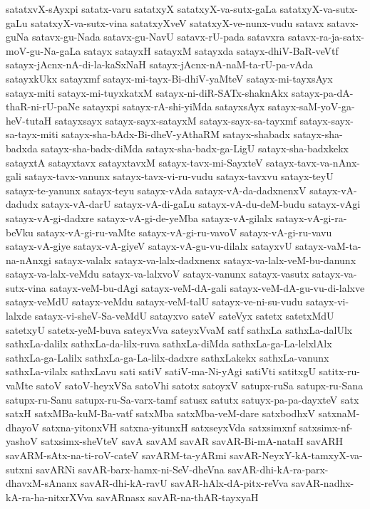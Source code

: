{satatxvX-sAyxpi
satatx-varu
satatxyX
satatxyX-va-sutx-gaLa
satatxyX-va-sutx-gaLu
satatxyX-va-sutx-vina
satatxyXveV
satatxyX-ve-nunx-vudu
satavx
satavx-guNa
satavx-gu-Nada
satavx-gu-NavU
satavx-rU-pada
satavxra
satavx-ra-ja-satx-moV-gu-Na-gaLa
satayx
satayxH
satayxM
satayxda
satayx-dhiV-BaR-veVtf
satayx-jAcnx-nA-di-la-kaSxNaH
satayx-jAcnx-nA-naM-ta-rU-pa-vAda
satayxkUkx
satayxmf
satayx-mi-tayx-Bi-dhiV-yaMteV
satayx-mi-tayxsAyx
satayx-miti
satayx-mi-tuyxkatxM
satayx-ni-diR-SATx-shaknAkx
satayx-pa-dA-thaR-ni-rU-paNe
satayxpi
satayx-rA-shi-yiMda
satayxsAyx
satayx-saM-yoV-ga-heV-tutaH
satayxsayx
satayx-sayx-satayxM
satayx-sayx-sa-tayxmf
satayx-sayx-sa-tayx-miti
satayx-sha-bAdx-Bi-dheV-yAthaRM
satayx-shabadx
satayx-sha-badxda
satayx-sha-badx-diMda
satayx-sha-badx-ga-LigU
satayx-sha-badxkekx
satayxtA
satayxtavx
satayxtavxM
satayx-tavx-mi-SayxteV
satayx-tavx-va-nAnx-gali
satayx-tavx-vanunx
satayx-tavx-vi-ru-vudu
satayx-tavxvu
satayx-teyU
satayx-te-yanunx
satayx-teyu
satayx-vAda
satayx-vA-da-dadxnenxV
satayx-vA-dadudx
satayx-vA-darU
satayx-vA-di-gaLu
satayx-vA-du-deM-budu
satayx-vAgi
satayx-vA-gi-dadxre
satayx-vA-gi-de-yeMba
satayx-vA-gilalx
satayx-vA-gi-ra-beVku
satayx-vA-gi-ru-vaMte
satayx-vA-gi-ru-vavoV
satayx-vA-gi-ru-vavu
satayx-vA-giye
satayx-vA-giyeV
satayx-vA-gu-vu-dilalx
satayxvU
satayx-vaM-ta-na-nAnxgi
satayx-valalx
satayx-va-lalx-dadxnenx
satayx-va-lalx-veM-bu-danunx
satayx-va-lalx-veMdu
satayx-va-lalxvoV
satayx-vanunx
satayx-vasutx
satayx-va-sutx-vina
satayx-veM-bu-dAgi
satayx-veM-dA-gali
satayx-veM-dA-gu-vu-di-lalxve
satayx-veMdU
satayx-veMdu
satayx-veM-talU
satayx-ve-ni-su-vudu
satayx-vi-lalxde
satayx-vi-sheV-Sa-veMdU
satayxvo
sateV
sateVyx
satetx
satetxMdU
satetxyU
satetx-yeM-buva
sateyxVva
sateyxVvaM
satf
sathxLa
sathxLa-dalUlx
sathxLa-dalilx
sathxLa-da-lilx-ruva
sathxLa-diMda
sathxLa-ga-La-lelxlAlx
sathxLa-ga-Lalilx
sathxLa-ga-La-lilx-dadxre
sathxLakekx
sathxLa-vanunx
sathxLa-vilalx
sathxLavu
sati
satiV
satiV-ma-Ni-yAgi
satiVti
satitxgU
satitx-ru-vaMte
satoV
satoV-heyxVSa
satoVhi
satotx
satoyxV
satupx-ruSa
satupx-ru-Sana
satupx-ru-Sanu
satupx-ru-Sa-varx-tamf
satusx
satutx
satuyx-pa-pa-dayxteV
satx
satxH
satxMBa-kuM-Ba-vatf
satxMba
satxMba-veM-dare
satxbodhxV
satxnaM-dhayoV
satxna-yitonxVH
satxna-yitunxH
satxseyxVda
satxsimxnf
satxsimx-nf-yashoV
satxsimx-sheVteV
savA
savAM
savAR
savAR-Bi-mA-nataH
savARH
savARM-sAtx-na-ti-roV-cateV
savARM-ta-yARmi
savAR-NeyxY-kA-tamxyX-va-sutxni
savARNi
savAR-barx-hamx-ni-SeV-dheVna
savAR-dhi-kA-ra-parx-dhavxM-sAnanx
savAR-dhi-kA-ravU
savAR-hAlx-dA-pitx-reVva
savAR-nadhx-kA-ra-ha-nitxrXVva
savARnasx
savAR-na-thAR-tayxyaH
}
